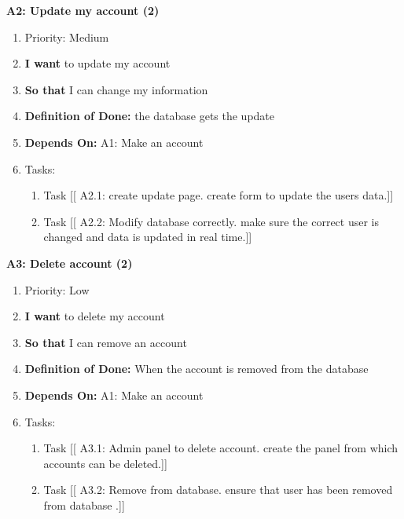 \textbf{A2: Update my account (2)}
\begin{enumerate}
    \item Priority: Medium
    \item \textbf{I want} to update my account
    \item \textbf{So that} I can change my information
    \item \textbf{Definition of Done:} the database gets the update
    \item \textbf{Depends On:} A1: Make an account
    \item Tasks:
    \begin{enumerate}
        \item Task [[ A2.1: create update page. create form to update the users data.]]
        \item Task [[ A2.2: Modify database correctly. make sure the correct user is changed and data is updated in real time.]]
    \end{enumerate}
\end{enumerate}

\vspace{2em}

\textbf{A3: Delete account (2)}
\begin{enumerate}
    \item Priority: Low
    \item \textbf{I want} to delete my account
    \item \textbf{So that} I can remove an account
    \item \textbf{Definition of Done:} When the account is removed from the database
    \item \textbf{Depends On:} A1: Make an account
    \item Tasks:
    \begin{enumerate}
        \item Task [[ A3.1: Admin panel to delete account. create the panel from which accounts can be deleted.]]
        \item Task [[ A3.2: Remove from database. ensure that user has been removed from database .]]
    \end{enumerate}
\end{enumerate}

\vspace{2em}

